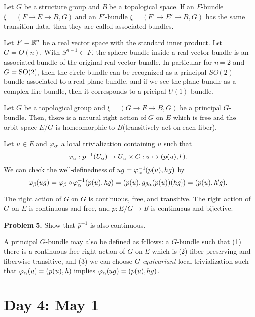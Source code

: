 \documentclass{../../small}
\begin{document}
\begin{defn}
Let $G$ be a structure group and $B$ be a topological space.
If an $F$-bundle $\xi=(F\to E\to B,G)$ and an $F'$-bundle $\xi=(F'\to E'\to B,G)$ has the same transition data, then they are called associated bundles.
\end{defn}


\begin{ex*}
Let $F=\mathbb{R}^n$ be a real vector space with the standard inner product.
Let $G=O(n)$.
With $S^{n-1}\subset F$, the sphere bundle inside a real vector bundle is an associated bundle of the original real vector bundle.
In particular for $n=2$ and $G=\mathrm{SO}(2)$, then the circle bundle can be recognized as a principal $SO(2)$-bundle associated to a real plane bundle, and if we see the plane bundle as a complex line bundle, then it corresponds to a pricipal $U(1)$-bundle.
\end{ex*}

\begin{prop}
Let $G$ be a topological group and $\xi=(G\to E\to B,G)$ be a principal $G$-bundle.
Then, there is a natural right action of $G$ on $E$ which is free and the orbit space $E/G$ is homeomorphic to $B$(transitively act on each fiber).
\end{prop}
\begin{pf}
Let $u\in E$ and $\varphi_\alpha$ a local trivialization containing $u$ such that
\[\varphi_\alpha:p^{-1}(U_\alpha)\to U_\alpha\times G:u\mapsto(p(u),h).\]
We can check the well-definedness of $ug=\varphi_\alpha^{-1}(p(u),hg)$ by
\[\varphi_\beta(ug)=\varphi_\beta\circ\varphi_\alpha^{-1}(p(u),hg)=(p(u),g_{\beta\alpha}(p(u))(hg))=(p(u),h'g).\]

The right action of $G$ on $G$ is continuous, free, and transitive.
The right action of $G$ on $E$ is continuous and free, and $\bar p:E/G\to B$ is continuous and bijective.
\end{pf}

\textbf{Problem 5.} Show that $\bar{p}^{-1}$ is also continuous.

\begin{rmk*}
A principal $G$-bundle may also be defined as follows: a $G$-bundle such that (1) there is a continuous free right action of $G$ on $E$ which is (2) fiber-preserving and fiberwise transitive, and (3) we can choose \emph{$G$-equivariant} local trivialization such that $\varphi_\alpha(u)=(p(u),h)$ implies $\varphi_\alpha(ug)=(p(u),hg)$.
\end{rmk*}

\newpage
\setcounter{section}{3}
\section{Day 4: May 1}
\setcounter{section}{2}
\setcounter{thm}{7}
\end{document}
